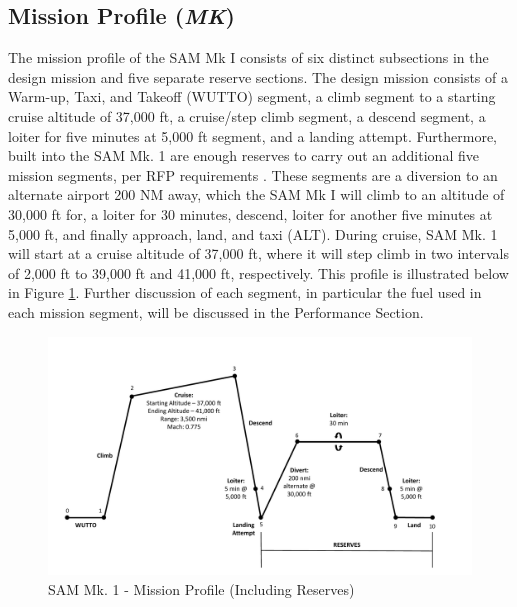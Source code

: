 \subsection{Mission Profile (\textit{MK})}
The mission profile of the SAM Mk I consists of six distinct subsections in the design mission and five separate reserve sections. The design mission consists of a Warm-up, Taxi, and Takeoff (WUTTO) segment, a climb segment to a starting cruise altitude of 37,000 ft, a cruise/step climb segment, a descend segment, a loiter for five minutes at 5,000 ft segment, and a landing attempt.  Furthermore, built into the SAM Mk. 1 are enough reserves to carry out an additional five mission segments, per RFP requirements \cite{RFP}. These segments are a diversion to an alternate airport 200 NM away, which the SAM Mk I will climb to an altitude of 30,000 ft for, a loiter for 30 minutes, descend, loiter for another five minutes at 5,000 ft, and finally approach, land, and taxi (ALT). During cruise, SAM Mk. 1 will start at a cruise altitude of 37,000 ft, where it will step climb in two intervals of 2,000 ft to 39,000 ft and 41,000 ft, respectively. This profile is illustrated below in Figure \ref{fig:missionprof}. Further discussion of each segment, in particular the fuel used in each mission segment, will be discussed in the Performance Section. 

\begin{figure}[!h]
    \centering
    \includegraphics[width=1.1\textwidth]{Photos/Mission_Profile_(4-14-20).pdf}
    \caption{SAM Mk. 1 - Mission Profile (Including Reserves)}
    \label{fig:missionprof}
 \end{figure}

